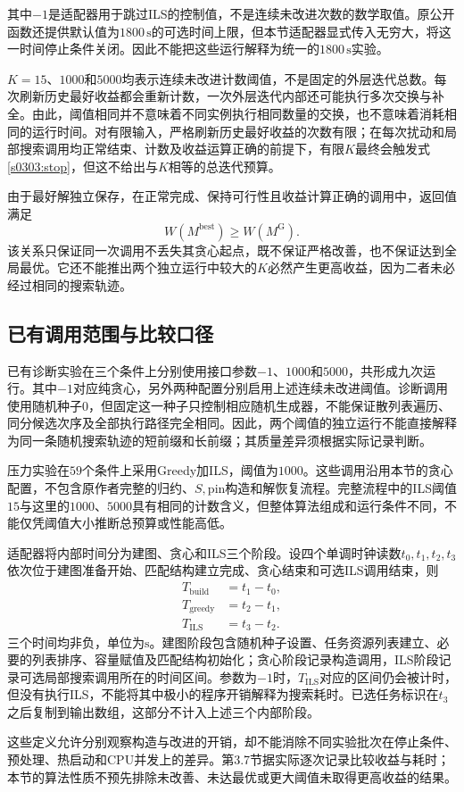 其中$-1$是适配器用于跳过ILS的控制值，不是连续未改进次数的数学取值。原公开函数还提供默认值为$1800\,\mathrm{s}$的可选时间上限，但本节适配器显式传入无穷大，将这一时间停止条件关闭。因此不能把这些运行解释为统一的$1800\,\mathrm{s}$实验。

$K=15$、$1000$和$5000$均表示连续未改进计数阈值，不是固定的外层迭代总数。每次刷新历史最好收益都会重新计数，一次外层迭代内部还可能执行多次交换与补全。由此，阈值相同并不意味着不同实例执行相同数量的交换，也不意味着消耗相同的运行时间。对有限输入，严格刷新历史最好收益的次数有限；在每次扰动和局部搜索调用均正常结束、计数及收益运算正确的前提下，有限$K$最终会触发式\eqref{s0303:stop}，但这不给出与$K$相等的总迭代预算。

由于最好解独立保存，在正常完成、保持可行性且收益计算正确的调用中，返回值满足
\begin{equation}
 W(M^{\mathrm{best}})\geq W(M^{\mathrm{G}}).
 \label{s0303:not_worse_than_greedy}
\end{equation}
该关系只保证同一次调用不丢失其贪心起点，既不保证严格改善，也不保证达到全局最优。它还不能推出两个独立运行中较大的$K$必然产生更高收益，因为二者未必经过相同的搜索轨迹。

\subsection{已有调用范围与比较口径}

已有诊断实验在三个条件上分别使用接口参数$-1$、$1000$和$5000$，共形成九次运行。其中$-1$对应纯贪心，另外两种配置分别启用上述连续未改进阈值。诊断调用使用随机种子$0$，但固定这一种子只控制相应随机生成器，不能保证散列表遍历、同分候选次序及全部执行路径完全相同。因此，两个阈值的独立运行不能直接解释为同一条随机搜索轨迹的短前缀和长前缀；其质量差异须根据实际记录判断。

压力实验在$59$个条件上采用Greedy加ILS，阈值为$1000$。这些调用沿用本节的贪心配置，不包含原作者完整的归约、$S,\mathrm{pin}$构造和解恢复流程。完整流程中的ILS阈值$15$与这里的$1000$、$5000$具有相同的计数含义，但整体算法组成和运行条件不同，不能仅凭阈值大小推断总预算或性能高低。

适配器将内部时间分为建图、贪心和ILS三个阶段。设四个单调时钟读数$t_0,t_1,t_2,t_3$依次位于建图准备开始、匹配结构建立完成、贪心结束和可选ILS调用结束，则
\begin{align}
 T_{\mathrm{build}}&=t_1-t_0,\label{s0303:build_timing}\\
 T_{\mathrm{greedy}}&=t_2-t_1,\label{s0303:greedy_timing}\\
 T_{\mathrm{ILS}}&=t_3-t_2.
 \label{s0303:timing}
\end{align}
三个时间均非负，单位为$\mathrm{s}$。建图阶段包含随机种子设置、任务资源列表建立、必要的列表排序、容量赋值及匹配结构初始化；贪心阶段记录构造调用，ILS阶段记录可选局部搜索调用所在的时间区间。参数为$-1$时，$T_{\mathrm{ILS}}$对应的区间仍会被计时，但没有执行ILS，不能将其中极小的程序开销解释为搜索耗时。已选任务标识在$t_3$之后复制到输出数组，这部分不计入上述三个内部阶段。

这些定义允许分别观察构造与改进的开销，却不能消除不同实验批次在停止条件、预处理、热启动和CPU并发上的差异。第3.7节据实际逐次记录比较收益与耗时；本节的算法性质不预先排除未改善、未达最优或更大阈值未取得更高收益的结果。
